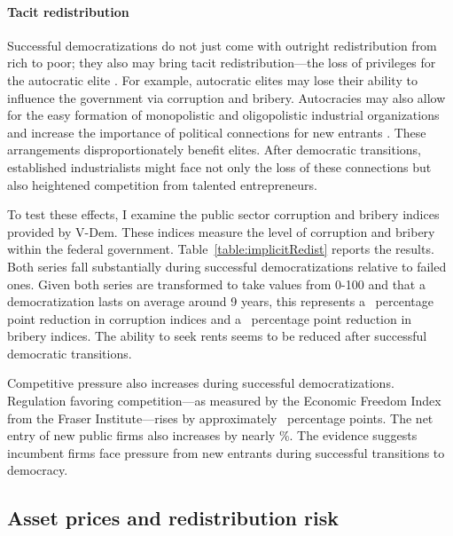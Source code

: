 

\paragraph{Tacit redistribution}
Successful democratizations do not just come with outright redistribution from rich to poor; they also may bring tacit redistribution---the loss of privileges for the autocratic elite \citep{Tullock1986}. For example, autocratic elites may lose their ability to influence the government via corruption and bribery. Autocracies may also allow for the easy formation of monopolistic and oligopolistic industrial organizations \citep{Li2003,Perotti2006,Karolyi2017} and increase the importance of political connections for new entrants \citep*{Li2008}. These arrangements disproportionately benefit elites. After democratic transitions, established industrialists might face not only the loss of these connections but also heightened competition from talented entrepreneurs.

To test these effects, I examine the public sector corruption and bribery indices provided by V-Dem. These indices measure the level of corruption and bribery within the federal government. Table~\ref{table:implicitRedist} reports the results. Both series fall substantially during successful democratizations relative to failed ones. Given both series are transformed to take values from 0-100 and that a democratization lasts on average around 9 years, this represents a \tabNineOneCE\ percentage point reduction in corruption indices and a \tabNineTwoCE\ percentage point reduction in bribery indices. The ability to seek rents seems to be reduced after successful democratic transitions. 

Competitive pressure also increases during successful democratizations. Regulation favoring competition---as measured by the Economic Freedom Index from the Fraser Institute---rises by approximately \tabNineThreeCE\ percentage points. The net entry of new public firms also increases by nearly \tabNineFourCE\%. The evidence suggests incumbent firms face pressure from new entrants during successful transitions to democracy.



\subsection{Asset prices and redistribution risk}\label{section:asset_prices_redist}

